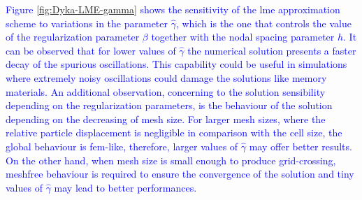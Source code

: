 \documentclass[preprint,12pt,a4paper]{elsarticle}
\begin{document}
\textcolor{blue}{Figure \eqref{fig:Dyka-LME-gamma} shows the sensitivity of the \acrshort{lme}
approximation scheme to variations in the parameter
$\widehat{\gamma}$, which is the one that controls the value of the regularization parameter
$\beta$ together with the nodal spacing parameter $h$. It can be observed that for lower values of $\widehat{\gamma}$ the numerical solution presents a faster decay of the spurious oscillations. This capability could be useful in simulations where
extremely noisy oscillations could damage the solutions like memory materials.  An additional observation, concerning to the
solution sensibility depending on the regularization parameters, is the behaviour of the solution depending on the decreasing of mesh size. For larger mesh sizes, where the relative particle displacement is negligible in comparison with the cell size, the global behaviour is \acrshort{fem}-like, therefore, larger values of $\widehat{\gamma}$ may offer better results. On the other hand, when mesh size is small enough to produce grid-crossing, meshfree behaviour is required to ensure the convergence of the solution and tiny values of $\widehat{\gamma}$ may lead to better performances.}
\end{document}
